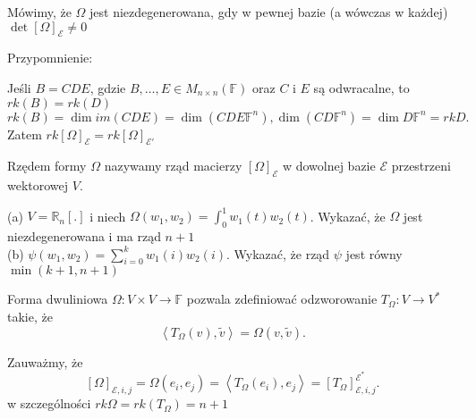 \documentclass[../main.tex]{subfiles}
\begin{document}
    \begin{definicja}
        Mówimy, że $\Omega$ jest niezdegenerowana, gdy w pewnej bazie (a wówczas w każdej) $\det \left[ \Omega \right] _\mathcal{E} \neq 0$
    \end{definicja}

    \begin{large}
        Przypomnienie:
    \end{large}
    Jeśli $B = CDE$, gdzie  $B,\ldots,E\in M_{n \times n}(\mathbb{F})$ oraz $C$ i  $E$ są odwracalne, to $rk(B) = rk(D)$\\
     \[
         rk(B) = \dim im(CDE) = \dim(CDE \mathbb{F}^n), \dim(C D \mathbb{F}^n) = \dim D \mathbb{F}^n = rk D
    .\]
    Zatem $rk \left[ \Omega \right] _\mathcal{E} = rk \left[ \Omega \right] _{\mathcal{E}'}$

    \begin{definicja}
        Rzędem formy $\Omega$ nazywamy rząd macierzy $\left[ \Omega \right] _\mathcal{E}$ w dowolnej bazie $\mathcal{E}$ przestrzeni wektorowej $V$.
    \end{definicja}

    \begin{przyklad}
        (a)
        $V = \mathbb{R}_n [.]$ i niech $\Omega(w_1,w_2) = \int_0^1 w_1(t)w_2(t)$. Wykazać, że $\Omega$ jest niezdegenerowana i ma rząd $n+1$ \\
        (b) $\psi(w_1,w_2) = \sum_{i=0}^k w_1(i)w_2(i)$. Wykazać, że rząd $\psi$ jest równy $\min(k+1,n+1)$
    \end{przyklad}

    Forma dwuliniowa $\Omega: V \times V \to \mathbb{F}$ pozwala zdefiniować odzworowanie $T_\Omega : V\to V^*$ takie, że \[
        \left < T_\Omega(v), \tilde v \right > = \Omega(v,\tilde v)
    .\]

    Zauważmy, że \[
        \left[ \Omega \right] _{\mathcal{E},i,j} = \Omega(e_i,e_j) = \left < T_\Omega (e_i),e_j \right > = \left[ T_\Omega \right] _{\mathcal{E},i,j}^{\mathcal{E}^*}
    .\]
    w szczególności $rk \Omega = rk( T_\Omega) = n+1$
\end{document}
